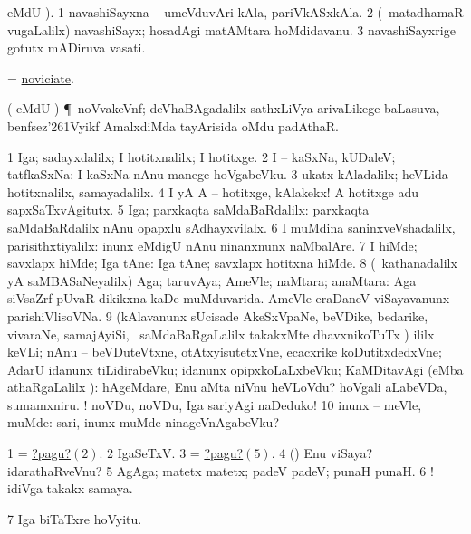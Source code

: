 \bentry
{}
\gl{\nA}
\bmng
{} eMdU \parx). 
\bnum
\num{1} navashiSayxna -- umeVduvAri kAla, pariVkASxkAla. 
\num{2} (\kanmu\ matadhamaR \mo vugaLalilx) navashiSayx; hosadAgi matAMtara hoMdidavanu. 
\num{3} navashiSayxrige gotutx mADiruva vasati. 
\enum
\emng
\eentry

\bentry
{}
\gl{\nA}
\bmng
= \hyperlink{noviciate}{noviciate}. 
\emng
\eentry

\bentry
{}
\gl{\nA}
\bmng
( eMdU \parx) \P\ noVvakeVnf; deVhaBAgadalilx sathxLiVya arivaLikege baLasuva, benfsez\char'261Vyikf AmalxdiMda tayArisida oMdu padAthaR. 
\emng
\eentry

\bentry
{}
\gl{\kirxvi}
\bmng
\bnum
\num{1} Iga; sadayxdalilx; I hotitxnalilx; I hotitxge. 
\num{2} I -- kaSxNa, kUDaleV; tatfkaSxNa:  I kaSxNa nAnu manege hoVgabeVku. 
\num{3} ukatx kAladalilx; heVLida -- hotitxnalilx, samayadalilx. 
\num{4} I yA A -- hotitxge, kAlakekx!  A hotitxge adu sapxSaTxvAgitutx. 
\num{5} Iga; parxkaqta saMdaBaRdalilx:  parxkaqta saMdaBaRdalilx nAnu opapxlu sAdhayxvilalx. 
\num{6} I muMdina saninxveVshadalilx, parisithxtiyalilx:  inunx eMdigU nAnu ninanxnunx naMbalAre. 
\num{7} I hiMde; savxlapx hiMde; Iga tAne:  Iga tAne; savxlapx hotitxna hiMde. 
\num{8} (\kanmu\ kathanadalilx yA saMBASaNeyalilx) Aga; taruvAya; AmeVle; naMtara; anaMtara:  Aga siVsaZrf pUvaR dikikxna kaDe muMduvarida.  AmeVle eraDaneV viSayavanunx parishiVlisoVNa. 
\num{9} (kAlavanunx sUcisade AkeSxVpaNe, beVDike, bedarike, vivaraNe, samajAyiSi, \mo\ saMdaBaRgaLalilx takakxMte dhavxnikoTuTx \parx) ililx keVLi; nAnu -- beVDuteVtxne, otAtxyisutetxVne, ecacxrike koDutitxdedxVne; AdarU idanunx tiLidirabeVku; idanunx opipxkoLaLxbeVku; KaMDitavAgi (eMba athaRgaLalilx \parx):  hAgeMdare, Enu aMta niVnu heVLoVdu?  hoVgali aLabeVDa, sumamxniru. ! noVDu, noVDu, Iga sariyAgi naDeduko! 
\num{10} inunx -- meVle, muMde:  sari, inunx muMde ninageVnAgabeVku? 
\enum
\emng

\noindent
\gl{\pagu}
\bmng
\bnum
\num{1}  = \hyperlink{nowpagu2}{?pagu?\((2)\)}. 
\hypertarget{nowpagu2}{} 
\num{2}  IgaSeTxV. 
\num{3}  = \hyperlink{nowpagu5}{?pagu?\((5)\)}. 
\num{4} (\pArxparx) Enu viSaya? idarathaRveVnu? 
\hypertarget{nowpagu5}{} 
\num{5}  AgAga; matetx matetx; padeV padeV; punaH punaH. 
\num{6} ! idiVga takakx samaya. 
\hypertarget{now(1) pagu(7)}{} 
\num{7}  Iga biTaTxre hoVyitu. 
\enum
\emng
\eentry 

